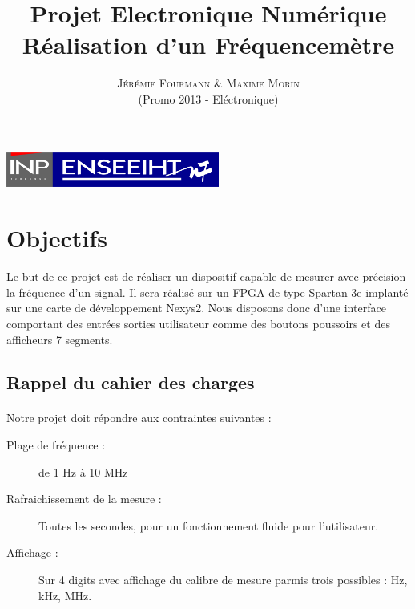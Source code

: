 \documentclass[a4paper,11pt]{article}
\title{\textbf{ \huge{Projet Electronique Numérique}}  \\{\Large Réalisation d'un Fréquencemètre}}
\author{
\textsc{Jérémie Fourmann \& Maxime Morin}\\ %
\textsc{} (Promo 2013 - Eléctronique)\\ %
}
\begin{document}
\pagestyle{plain}

\maketitle
\begin{center}
\includegraphics[width=7cm]{inp-enseeiht.pdf}   
\end{center}

\vspace{.1cm}
\renewcommand{\contentsname}{Plan}
\setcounter{tocdepth}{2}
\tableofcontents
\vspace{.1cm}

\newpage
\section{Objectifs}
Le but de ce projet est de réaliser un dispositif capable de mesurer avec précision la fréquence d'un signal.
Il sera réalisé sur un FPGA de type Spartan-3e implanté sur une carte de développement Nexys2.
Nous disposons donc d'une interface comportant des entrées sorties utilisateur comme des boutons poussoirs et des 
afficheurs 7 segments.

\subsection{Rappel du cahier des charges}

\paragraph{} Notre projet doit répondre aux contraintes suivantes :

\begin{description}
\item[Plage de fréquence : ] de 1 Hz à 10 MHz
\item[Rafraichissement de la mesure :] Toutes les secondes, pour un fonctionnement fluide pour l'utilisateur.
\item[Affichage : ] Sur 4 digits avec affichage du calibre de mesure parmis trois possibles : Hz, kHz, MHz.
\end{description}
\end{document}
